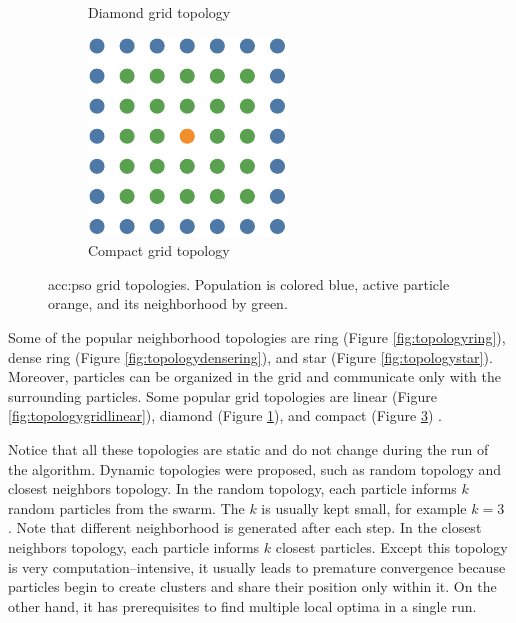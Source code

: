 \begin{figure}[t]
\begin{subfigure}[t]{0.3\textwidth}
        \caption{Diamond grid topology}
        \label{fig:topologygriddiamond}
    \end{subfigure}
    \hfill
    \begin{subfigure}[t]{0.3\textwidth}
        \includegraphics[width=\textwidth]{img/master_neigh_compact.pdf}
        \caption{Compact grid topology}
        \label{fig:topologygridcompact}
    \end{subfigure}
    \caption[\acrshort*{acc:pso} grid topologies]{\acrshort*{acc:pso} grid topologies. Population is colored blue, active particle orange, and its neighborhood by green.}
\end{figure}

Some of the popular neighborhood topologies are ring (Figure \ref{fig:topologyring}), dense ring (Figure \ref{fig:topologydensering}), and star (Figure \ref{fig:topologystar}). Moreover, particles can be organized in the grid and communicate only with the surrounding particles. Some popular grid topologies are linear (Figure \ref{fig:topologygridlinear}), diamond (Figure \ref{fig:topologygriddiamond}), and compact (Figure \ref{fig:topologygridcompact}) \citep{PSOtopologies}.

Notice that all these topologies are static and do not change during the run of the algorithm. Dynamic topologies were proposed, such as random topology and closest neighbors topology. In the random topology, each particle informs $k$ random particles from the swarm. The $k$ is usually kept small, for example $k=3$ \citep{SPSObenchmark}. Note that different neighborhood is generated after each step. In the closest neighbors topology, each particle informs $k$ closest particles. Except this topology is very computation--intensive, it usually leads to premature convergence because particles begin to create clusters and share their position only within it. On the other hand, it has prerequisites to find multiple local optima in a single run.

